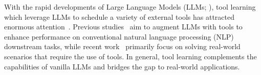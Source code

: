 


With the rapid developments of Large Language Models (LLMs; \citealp{brown2020language, geminiteam2023gemini,openai2023gpt4, touvron2023llama}), tool learning which leverage LLMs to schedule a variety of external tools has attracted enormous attention~\cite{nakano2022webgpt, yao2023react, lu2023chameleon}.
Previous studies~\citep{hao2023toolkengpt, hsieh2023tool, schick2023toolformer, tang2023toolalpaca} aim to augment LLMs with tools to enhance performance on conventional natural language processing (NLP) downstream tasks, while recent work~\citep{qin2023webcpm, NEURIPS2022_82ad13ec_webshop, cai2024large} primarily focus on solving real-world scenarios that require the use of tools.
In general, tool learning complements the capabilities of vanilla LLMs and bridges the gap to real-world applications.


